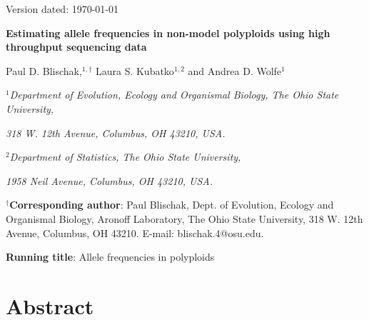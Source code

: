 \documentclass[11pt,english,letterpaper,oneside]{article}
\begin{document}
\newcommand{\tmat}{$\bm{T}$}
\newcommand{\rmat}{$\bm{R}$}

\hfill Version dated: \mydate\today
\vspace{0.25in}

\begin{center}

{\LARGE \bfseries Estimating allele frequencies in non-model polyploids using high throughput sequencing data}
\vspace{0.45in}

Paul D. Blischak,$^{1,\dagger}$ Laura S. Kubatko$^{1,2}$ and Andrea D. Wolfe$^1$
\vspace{0.45in}


\textit{$^1$Department of Evolution, Ecology and Organismal Biology, The Ohio State University,}

\textit{318 W. 12th Avenue, Columbus, OH 43210, USA.}
\bigskip
\bigskip

\textit{$^2$Department of Statistics, The Ohio State University,}

\textit{1958 Neil Avenue, Columbus, OH 43210, USA.}


\end{center}
\vspace{0.45in}


\noindent $^\dagger$\textbf{Corresponding author}: Paul Blischak, Dept. of Evolution, Ecology and Organismal Biology, Aronoff Laboratory, The Ohio State University, 318 W. 12th Avenue, Columbus, OH 43210. E-mail: blischak.4@osu.edu.

\vspace{0.25in}

\noindent \textbf{Running title}: Allele frequencies in polyploids

\vspace{.25in}

\section*{Abstract}                      %
\end{document}
